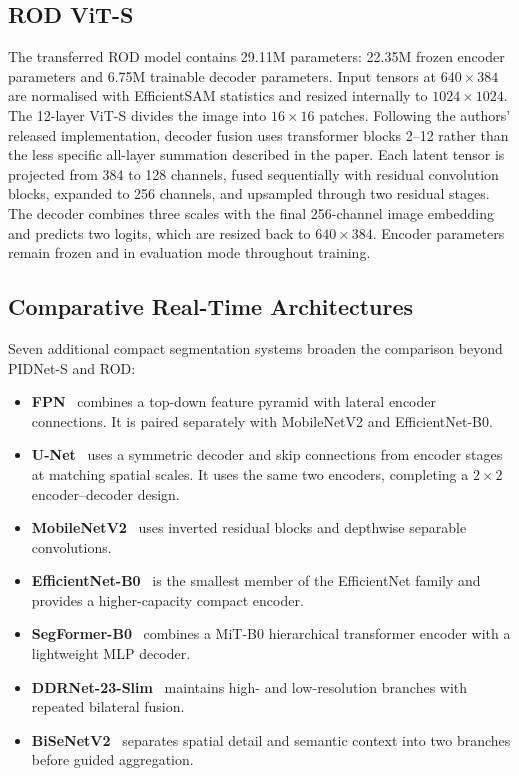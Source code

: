 \documentclass[12pt,a4paper]{report}
\begin{document}
\subsection{ROD ViT-S}

The transferred ROD model contains 29.11M parameters: 22.35M frozen encoder
parameters and 6.75M trainable decoder parameters. Input tensors at
$640\times384$ are normalised with EfficientSAM statistics and resized
internally to $1024\times1024$. The 12-layer ViT-S divides the image into
$16\times16$ patches. Following the authors' released implementation, decoder
fusion uses transformer blocks 2--12 rather than the less specific all-layer
summation described in the paper. Each latent tensor is projected from 384 to
128 channels, fused sequentially with residual convolution blocks, expanded to
256 channels, and upsampled through two residual stages. The decoder combines
three scales with the final 256-channel image embedding and predicts two logits,
which are resized back to $640\times384$. Encoder parameters remain frozen and
in evaluation mode throughout training.

\subsection{Comparative Real-Time Architectures}

Seven additional compact segmentation systems broaden the comparison beyond
PIDNet-S and ROD:
\begin{itemize}[nosep]
  \item \textbf{FPN}~\cite{lin2017fpn} combines a top-down feature pyramid with
  lateral encoder connections. It is paired separately with MobileNetV2 and
  EfficientNet-B0.
  \item \textbf{U-Net}~\cite{ronneberger2015unet} uses a symmetric decoder and
  skip connections from encoder stages at matching spatial scales. It uses the
  same two encoders, completing a $2\times2$ encoder--decoder design.
  \item \textbf{MobileNetV2}~\cite{sandler2018mobilenetv2} uses inverted
  residual blocks and depthwise separable convolutions.
  \item \textbf{EfficientNet-B0}~\cite{tan2019efficientnet} is the smallest
  member of the EfficientNet family and provides a higher-capacity compact
  encoder.
  \item \textbf{SegFormer-B0}~\cite{xie2021segformer} combines a MiT-B0
  hierarchical transformer encoder with a lightweight MLP decoder.
  \item \textbf{DDRNet-23-Slim}~\cite{hong2022ddrnet} maintains high- and
  low-resolution branches with repeated bilateral fusion.
  \item \textbf{BiSeNetV2}~\cite{yu2021bisenetv2} separates spatial detail and
  semantic context into two branches before guided aggregation.
\end{itemize}
\end{document}
